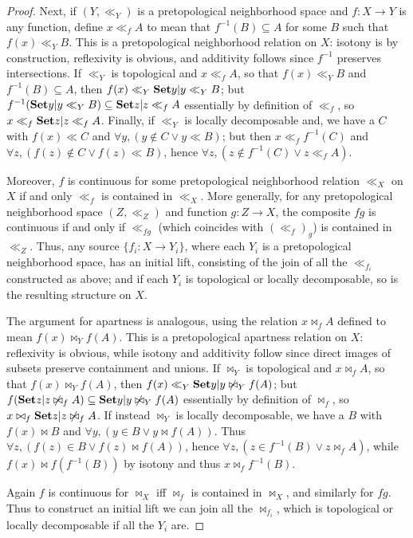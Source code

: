 \documentclass{article}
\def\cpl#1{\neg #1}
\def\inv{^{-1}}
\def\nn{\ensuremath{\neg\neg}}
\def\Set{\mathbf{Set}}
\def\APTopnn{\mathbf{pATop}_{\nn}}
\begin{document}
\begin{proof}
  Next, if $(Y,\ll_Y)$ is a pretopological neighborhood space and $f:X\to Y$ is any function, define $x\ll_f A$ to mean that $f\inv(B)\subseteq A$ for some $B$ such that $f(x)\ll_Y B$.
  This is a pretopological neighborhood relation on $X$: isotony is by construction, reflexivity is obvious, and additivity follows since $f\inv$ preserves intersections.
  If $\ll_Y$ is topological and $x\ll_f A$, so that $f(x)\ll_Y B$ and $f\inv(B)\subseteq A$, then $f(x)\ll_Y \setof{y|y\ll_Y B}$; but $f\inv(\setof{y|y\ll_Y B}) \subseteq \setof{z|z\ll_f A}$ essentially by definition of $\ll_f$, so $x \ll_f \setof{z|z\ll_f A}$.
  Finally, if $\ll_Y$ is locally decomposable and, we have a $C$ with $f(x)\ll C$ and $\forall y, (y\notin C \lor y\ll B)$; but then $x\ll_f f\inv(C)$ and $\forall z, (f(z)\notin C \lor f(z) \ll B)$, hence $\forall z, (z\notin f\inv(C) \lor z \ll_f A)$.

  Moreover, $f$ is continuous for some pretopological neighborhood relation $\ll_X$ on $X$ if and only $\ll_f$ is contained in $\ll_X$.
  More generally, for any pretopological neighborhood space $(Z,\ll_Z)$ and function $g:Z\to X$, the composite $f g$ is continuous if and only if $\ll_{f g}$ (which coincides with $(\ll_f)_g$) is contained in $\ll_Z$.
  Thus, any source $\{ f_i : X \to Y_i \}$, where each $Y_i$ is a pretopological neighborhood space, has an initial lift, consisting of the join of all the $\ll_{f_i}$ constructed as above; and if each $Y_i$ is topological %
  or locally decomposable, so is the resulting structure on $X$.

  The argument for apartness is analogous, using the relation $x\bowtie_f A$ defined to mean $f(x)\bowtie_Y f(A)$.
  This is a pretopological apartness relation on $X$: reflexivity is obvious, while isotony and additivity follow since direct images of subsets preserve containment and unions.
  If $\bowtie_Y$ is topological and $x\bowtie_f A$, so that $f(x)\bowtie_Y f(A)$, then $f(x) \ll_Y \setof{y|y\not\bowtie_Y f(A)}$; but $f(\setof{z|z\not\bowtie_f A}) \subseteq \setof{y|y\not\bowtie_Y f(A)}$ essentially by definition of $\bowtie_f$, so $x\bowtie_f \setof{z|z\not\bowtie_f A}$.
  If instead $\bowtie_Y$ is locally decomposable, we have a $B$ with $f(x)\bowtie B$ and $\forall y,(y\in B \lor y\bowtie f(A))$.
  Thus $\forall z, (f(z)\in B \lor f(z)\bowtie f(A))$, hence $\forall z, (z\in f\inv(B) \lor z\bowtie_f A)$, while $f(x) \bowtie f(f\inv(B))$ by isotony and thus $x \bowtie_f f\inv(B)$.

  Again $f$ is continuous for $\bowtie_X$ iff $\bowtie_f$ is contained in $\bowtie_X$, and similarly for $f g$.
  Thus to construct an initial lift we can join all the $\bowtie_{f_i}$, which is topological or locally decomposable if all the $Y_i$ are.
\end{proof}
\end{document}
